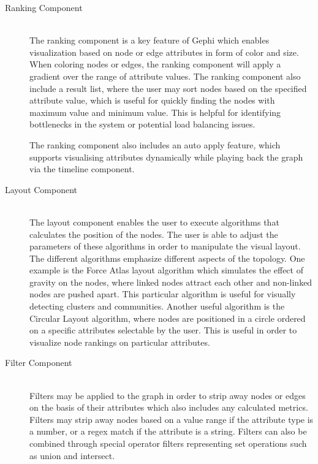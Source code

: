 \begin{description}
\item[Ranking Component] \hfill \\

    The ranking component is a key feature of Gephi which enables
    visualization based on node or edge attributes in form of color
    and size. When coloring nodes or edges, the ranking component
    will apply a gradient over the range of attribute values. The
    ranking component also include a result list, where the user may
    sort nodes based on the specified attribute value, which is
    useful for quickly finding the nodes with maximum value and
    minimum value. This is helpful for identifying bottlenecks in
    the system or potential load balancing issues.

    The ranking component also includes an auto apply feature, which
    supports visualising attributes dynamically while playing back the
    graph via the timeline component.

\item[Layout Component] \hfill \\

    The layout component enables the user to execute algorithms that
    calculates the position of the nodes. The user is able to adjust the
    parameters of these algorithms in order to manipulate the visual
    layout. The different algorithms emphasize different aspects of the
    topology. One example is the Force Atlas layout algorithm which
    simulates the effect of gravity on the nodes, where linked nodes
    attract each other and non-linked nodes are pushed apart. This
    particular algorithm is useful for visually detecting clusters and
    communities. Another useful algorithm is the Circular Layout
    algorithm, where nodes are positioned in a circle ordered on a
    specific attributes selectable by the user. This is useful in order
    to visualize node rankings on particular attributes.

\item[Filter Component] \hfill \\

    Filters may be applied to the graph in order to strip away nodes or
    edges on the basis of their attributes which also includes any
    calculated metrics. Filters may strip away nodes based on a value range if
    the attribute type is a number, or a regex match if the attribute is
    a string. Filters can also be combined through special operator filters
    representing set operations such as union and intersect.


\end{description}
